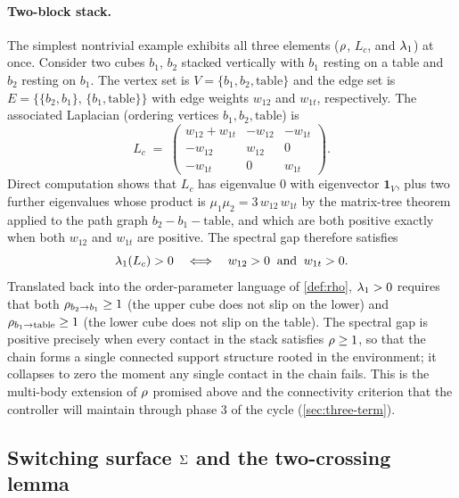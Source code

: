 \paragraph{Two-block stack.}
The simplest nontrivial example exhibits all three elements
($\rho$, $L_{c}$, and $\lambda_{1}$) at once. Consider two
cubes $b_{1}$, $b_{2}$ stacked vertically with $b_{1}$ resting
on a table and $b_{2}$ resting on $b_{1}$. The vertex set is
$V = \{b_{1}, b_{2}, \text{table}\}$ and the edge set is
$E = \{\{b_{2}, b_{1}\},\,\{b_{1}, \text{table}\}\}$ with edge
weights $w_{12}$ and $w_{1t}$, respectively. The associated
Laplacian (ordering vertices $b_{1}, b_{2}, \text{table}$) is
\begin{equation}
\label{eq:two-block-L}
  L_{c} \;=\;
  \begin{pmatrix}
    w_{12} + w_{1t} & -w_{12} & -w_{1t} \\
    -w_{12} & w_{12} & 0 \\
    -w_{1t} & 0 & w_{1t}
  \end{pmatrix}.
\end{equation}
Direct computation shows that $L_{c}$ has eigenvalue $0$ with
eigenvector $\mathbf{1}_{V}$, plus two further eigenvalues
whose product is $\mu_{1}\mu_{2} = 3\,w_{12}\,w_{1t}$ by the
matrix-tree theorem applied to the path graph
$b_{2}\!-\!b_{1}\!-\!\text{table}$, and which are both positive
exactly when both $w_{12}$ and $w_{1t}$ are positive. The
spectral gap therefore satisfies
\begin{equation}
\label{eq:two-block-specgap}
  \lambda_{1}(L_{c}) > 0
  \quad\Longleftrightarrow\quad
  w_{12} > 0 \;\;\text{and}\;\; w_{1t} > 0.
\end{equation}
Translated back into the order-parameter language of
\cref{def:rho}, $\lambda_{1} > 0$ requires that both
$\rho_{b_{2} \to b_{1}} \ge 1$ (the upper cube does not
slip on the lower) and $\rho_{b_{1} \to \text{table}} \ge
1$ (the lower cube does not slip on the table). The spectral
gap is positive precisely when every contact in the stack
satisfies $\rho \ge 1$, so that the chain forms a single
connected support structure rooted in the environment;
it collapses to zero the moment any single contact in the chain
fails. This is the multi-body extension of $\rho$ promised
above and the connectivity criterion that the controller will
maintain through phase 3 of the cycle (\cref{sec:three-term}).

\subsection{Switching surface $\Sigma$ and the two-crossing lemma}
\label{sec:Sigma}

